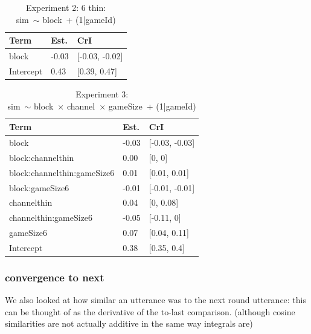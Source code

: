 \documentclass[
  english,
  a4paper,
]{article}
\begin{document}
\begin{table}[h!]

\caption{\label{tab:unnamed-chunk-17}Experiment 2: 6 thin:\\ sim~$\sim$ block~+ (1|gameId)}
\centering
\begin{tabular}[t]{lll}
\toprule
Term & Est. & CrI\\
\midrule
block & -0.03 & {}[-0.03, -0.02]\\
Intercept & 0.43 & {}[0.39, 0.47]\\
\bottomrule
\end{tabular}
\end{table}

\begin{table}[h!]

\caption{\label{tab:unnamed-chunk-17}Experiment 3:\\ sim~$\sim$ block~$\times$ channel~$\times$ gameSize~+ (1|gameId)}
\centering
\begin{tabular}[t]{lll}
\toprule
Term & Est. & CrI\\
\midrule
block & -0.03 & {}[-0.03, -0.03]\\
block:channelthin & 0.00 & {}[0, 0]\\
block:channelthin:gameSize6 & 0.01 & {}[0.01, 0.01]\\
block:gameSize6 & -0.01 & {}[-0.01, -0.01]\\
channelthin & 0.04 & {}[0, 0.08]\\
\addlinespace
channelthin:gameSize6 & -0.05 & {}[-0.11, 0]\\
gameSize6 & 0.07 & {}[0.04, 0.11]\\
Intercept & 0.38 & {}[0.35, 0.4]\\
\bottomrule
\end{tabular}
\end{table}

\pagebreak

\hypertarget{convergence-to-next}{%
\subsubsection{convergence to next}\label{convergence-to-next}}

We also looked at how similar an utterance was to the next round utterance: this can be thought of as the derivative of the to-last comparison. (although cosine similarities are not actually additive in the same way integrals are)
\end{document}
